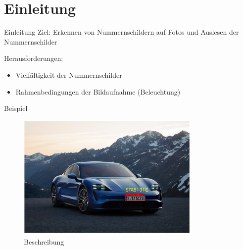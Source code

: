 \section{Einleitung}

\begin{frame}{Einleitung}
    Ziel: Erkennen von Nummernschildern auf Fotos und Auslesen der Nummernschilder
    
    Herausforderungen:
    \begin{itemize}
        \item Vielfältigkeit der Nummernschilder
        \item Rahmenbedingungen der Bildaufnahme (Beleuchtung)
    \end{itemize}
\end{frame}

\begin{frame}{Beispiel}
  \begin{figure}
    \begin{center}
      \includegraphics[width=0.8\textwidth]{bilder/Bild2}
      \caption{Beschreibung}
    \end{center}
  \end{figure}
\end{frame}
